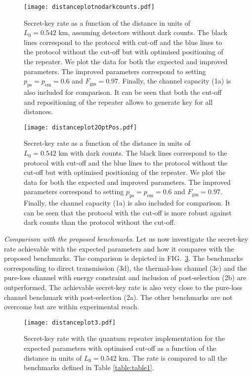 \documentclass[aps,pra,reprint,superscriptaddress]{revtex4-1}
\begin{document}
\begin{figure}
\centering
\texttt{[image: distanceplotnodarkcounts.pdf]}
\caption{Secret-key rate as a function of the distance in units of $L_0= 0.542 \text{ km}$, assuming detectors without dark counts. The black lines correspond to the protocol with cut-off and the blue lines to the protocol without the cut-off but with optimised positioning of the repeater. We plot the data for both the expected and improved parameters. The improved parameters correspond to setting $p_{\textrm{ps}} = p_{\textrm{em}} = 0.6$ and $F_{\textrm{gm}} = 0.97$. Finally, the channel capacity (1a) is also included for comparison. It can be seen that both the cut-off and repositioning of the repeater allows to generate key for all distances.}
\label{fig:distanceplotNoDarkCounts}
\end{figure}


\begin{figure}
\centering
\texttt{[image: distanceplot2OptPos.pdf]}
\caption{Secret-key rate as a function of the distance in units of $L_0= 0.542 \text{ km}$ with dark counts. The black lines correspond to the protocol with cut-off and the blue lines to the protocol without the cut-off but with optimised positioning of the repeater. We plot the data for both the expected and improved parameters. The improved parameters correspond to setting $p_{\textrm{ps}} = p_{\textrm{em}} = 0.6$ and $F_{\textrm{gm}} = 0.97$. Finally, the channel capacity (1a) is also included for comparison. It can be seen that the protocol with the cut-off is more robust against dark counts than the protocol without the cut-off.}
\label{fig:distanceplot2}
\end{figure}



\smallskip
\textit{Comparison with the proposed benchmarks.}
Let us now investigate the secret-key rate achievable with the expected parameters and how it compares with the proposed benchmarks. The comparison is depicted in FIG.~\ref{fig:distanceplot3}. The benchmarks corresponding to direct transmission (3d), the thermal-loss channel (3c) and the pure-loss channel with energy constraint and inclusion of post-selection (2b) are outperformed. The achievable secret-key rate is also very close to the pure-loss channel benchmark with post-selection (2a). The other benchmarks are not overcome but are within experimental reach. 

\begin{figure}[h]
\centering
\texttt{[image: distanceplot3.pdf]}
\caption{Secret-key rate with the quantum repeater implementation for the expected parameters with optimised cut-off as a function of the distance in units of $L_0= 0.542 \text{ km}$. 
The rate is compared to all the benchmarks defined in Table \ref{table:table1}.}
\label{fig:distanceplot3}
\end{figure}
\end{document}
